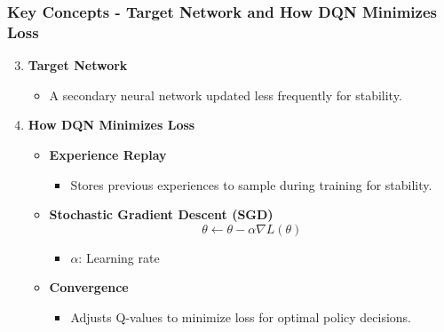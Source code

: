 \documentclass{beamer}
\begin{document}
\begin{frame}[fragile]
    \frametitle{Key Concepts - Target Network and How DQN Minimizes Loss}
    \begin{enumerate}
        \setcounter{enumi}{2}
        \item \textbf{Target Network}
        \begin{itemize}
            \item A secondary neural network updated less frequently for stability.
        \end{itemize}
        
        \item \textbf{How DQN Minimizes Loss}
        \begin{itemize}
            \item \textbf{Experience Replay}
            \begin{itemize}
                \item Stores previous experiences to sample during training for stability.
            \end{itemize}
            \item \textbf{Stochastic Gradient Descent (SGD)}
            \begin{equation}
                \theta \leftarrow \theta - \alpha \nabla L(\theta)
            \end{equation}
            \begin{itemize}
                \item \( \alpha \): Learning rate
            \end{itemize}
            \item \textbf{Convergence}
            \begin{itemize}
                \item Adjusts Q-values to minimize loss for optimal policy decisions.
            \end{itemize}
        \end{itemize}
    \end{enumerate}
\end{frame}
\end{document}
